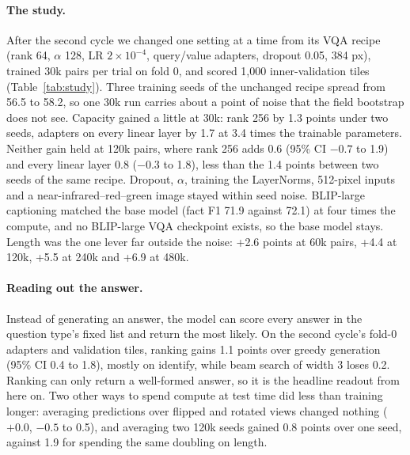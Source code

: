 \documentclass[10pt,twocolumn]{article}
\begin{document}
\paragraph{The study.} After the second cycle we changed one setting at a time from its VQA recipe (rank 64, $\alpha$ 128, LR $2\!\times\!10^{-4}$, query/value adapters, dropout 0.05, 384 px), trained 30k pairs per trial on fold 0, and scored 1,000 inner-validation tiles (Table~\ref{tab:study}). Three training seeds of the unchanged recipe spread from 56.5 to 58.2, so one 30k run carries about a point of noise that the field bootstrap does not see. Capacity gained a little at 30k: rank 256 by 1.3 points under two seeds, adapters on every linear layer by 1.7 at 3.4 times the trainable parameters. Neither gain held at 120k pairs, where rank 256 adds 0.6 (95\% CI $-0.7$ to 1.9) and every linear layer 0.8 ($-0.3$ to 1.8), less than the 1.4 points between two seeds of the same recipe. Dropout, $\alpha$, training the LayerNorms, 512-pixel inputs and a near-infrared--red--green image stayed within seed noise. BLIP-large captioning matched the base model (fact F1 71.9 against 72.1) at four times the compute, and no BLIP-large VQA checkpoint exists, so the base model stays. Length was the one lever far outside the noise: +2.6 points at 60k pairs, +4.4 at 120k, +5.5 at 240k and +6.9 at 480k.

\paragraph{Reading out the answer.} Instead of generating an answer, the model can score every answer in the question type's fixed list and return the most likely. On the second cycle's fold-0 adapters and validation tiles, ranking gains 1.1 points over greedy generation (95\% CI 0.4 to 1.8), mostly on identify, while beam search of width 3 loses 0.2. Ranking can only return a well-formed answer, so it is the headline readout from here on. Two other ways to spend compute at test time did less than training longer: averaging predictions over flipped and rotated views changed nothing ($+0.0$, $-0.5$ to 0.5), and averaging two 120k seeds gained 0.8 points over one seed, against 1.9 for spending the same doubling on length.
\end{document}

